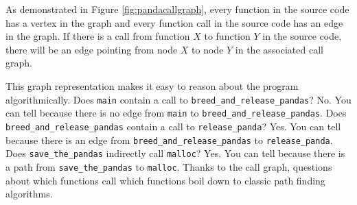 

As demonstrated in Figure \ref{fig:pandacallgraph}, every function in the source code has a vertex in the graph and every function call in the source code has an edge in the graph.  If there is a call from function $X$ to function $Y$ in the source code, there will be an edge pointing from node $X$ to node $Y$ in the associated call graph. 

\begin{sloppypar}
This graph representation makes it easy to reason about the program algorithmically.  Does \lstinline{main} contain a call to \lstinline{breed_and_release_pandas}?  No.  You can tell because there is no edge from \lstinline{main} to \lstinline{breed_and_release_pandas}.  Does \lstinline{breed_and_release_pandas} contain a call to \lstinline{release_panda}?  Yes.  You can tell because there is an edge from \lstinline{breed_and_release_pandas} to \lstinline{release_panda}.  Does \lstinline{save_the_pandas} indirectly call \lstinline{malloc}?  Yes.  You can tell because there is a path from \lstinline{save_the_pandas} to \lstinline{malloc}.  Thanks to the call graph, questions about which functions call which functions boil down to classic path finding algorithms.  
\end{sloppypar}

